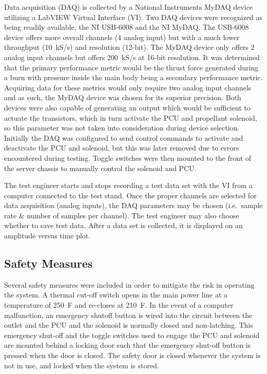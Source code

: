 \documentclass[conference]{IEEEtran}
\begin{document}
Data acquisition (DAQ) is collected by a National Instruments MyDAQ device utilizing a LabVIEW Virtual Interface (VI).
Two DAQ devices were recognized as being readily available, the NI USB-6008 and the NI MyDAQ.\@
The USB-6008 device offers more overall channels (4 analog input) but with a much lower throughput (\SI{10}{kS/s}) and resolution (12-bit).
The MyDAQ device only offers 2 analog input channels but offers \SI{200}{kS/s} at 16-bit resolution. It was determined that the primary performance metric would be the thrust force generated during a burn with pressure inside the main body being a secondary performance metric.
Acquiring data for these metrics would only require two analog input channels and as such, the MyDAQ device was chosen for its superior precision.
Both devices were also capable of generating an output which would be sufficient to actuate the transistors, which in turn activate the PCU and propellant solenoid, so this parameter was not taken into consideration during device selection.
Initially the DAQ was configured to send control commands to activate and deactivate the PCU and solenoid, but this was later removed due to errors encountered during testing. Toggle switches were then mounted to the front of the server chassis to manually control the solenoid and PCU.

The test engineer starts and stops recording a test data set with the VI
from a computer connected to the test stand.
Once the proper channels are selected for data acquisition (analog inputs), the DAQ parameters may be chosen (i.e.\ sample rate \& number of samples per channel).
The test engineer may also choose whether to save test data.
After a data set is collected, it is displayed on an amplitude versus time plot.

\subsection{Safety Measures}
Several safety measures were included in order to mitigate the risk in operating the system. A thermal cut-off switch opens in the main power line at a temperature of \SI{250}{F} and re-closes at \SI{210}{F}. In the event of a computer malfunction, an emergency shutoff button is wired into the circuit between the outlet and the PCU and the solenoid is normally closed and non-latching.
This emergency shut-off and the toggle switches used to engage the PCU and solenoid are mounted behind a locking door such that the emergency shut-off button is pressed when the door is closed.
The safety door is closed whenever the system is not in use, and locked when the system is stored.
\end{document}
